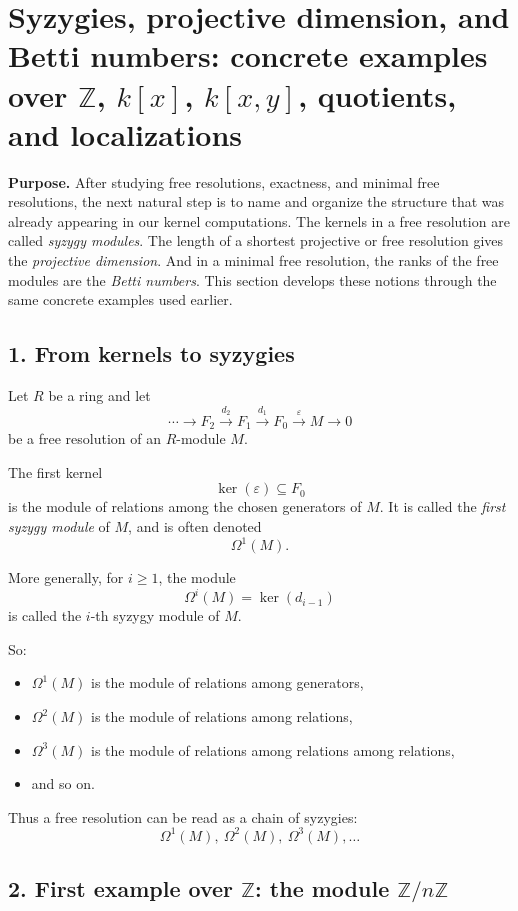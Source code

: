 \documentclass[12pt,a4paper]{article}
\theoremstyle{notespace}
\theoremstyle{definition}
\begin{document}
\section{Syzygies, projective dimension, and Betti numbers: concrete examples over \(\mathbb Z\), \(k[x]\), \(k[x,y]\), quotients, and localizations}

\textbf{Purpose.}
After studying free resolutions, exactness, and minimal free resolutions, the next natural step is to name and organize the structure that was already appearing in our kernel computations.
The kernels in a free resolution are called \emph{syzygy modules}.
The length of a shortest projective or free resolution gives the \emph{projective dimension}.
And in a minimal free resolution, the ranks of the free modules are the \emph{Betti numbers}.
This section develops these notions through the same concrete examples used earlier.

\subsection{1. From kernels to syzygies}

Let \(R\) be a ring and let
\[
\cdots \longrightarrow F_2 \xrightarrow{d_2} F_1 \xrightarrow{d_1} F_0 \xrightarrow{\varepsilon} M \longrightarrow 0
\]
be a free resolution of an \(R\)-module \(M\).

The first kernel
\[
\ker(\varepsilon)\subseteq F_0
\]
is the module of relations among the chosen generators of \(M\).
It is called the \emph{first syzygy module} of \(M\), and is often denoted
\[
\Omega^1(M).
\]

More generally, for \(i\geq 1\), the module
\[
\Omega^i(M)=\ker(d_{i-1})
\]
is called the \(i\)-th syzygy module of \(M\).

So:
\begin{itemize}
	\item \(\Omega^1(M)\) is the module of relations among generators,
	\item \(\Omega^2(M)\) is the module of relations among relations,
	\item \(\Omega^3(M)\) is the module of relations among relations among relations,
	\item and so on.
\end{itemize}

Thus a free resolution can be read as a chain of syzygies:
\[
\Omega^1(M),\ \Omega^2(M),\ \Omega^3(M),\dots
\]

\subsection{2. First example over \(\mathbb Z\): the module \(\mathbb Z/n\mathbb Z\)}
\end{document}
